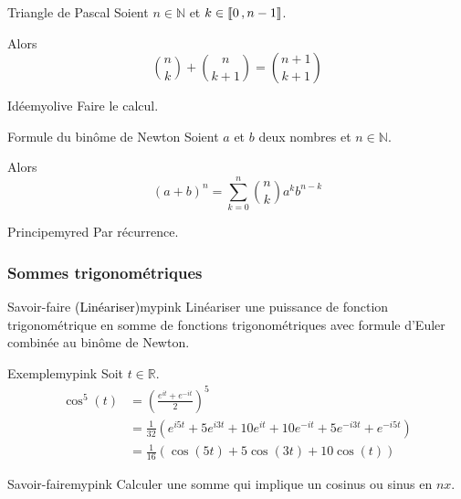     \begin{prop}{Triangle de Pascal}{}
        Soient $n \in \mathbb{N}$ et $k \in \left\llbracket 0 \, , n-1 \right\rrbracket$.
    
        Alors \[ \binom{n}{k} + \binom{n}{k+1} = \binom{n+1}{k+1} \]
    \end{prop}
    
    \begin{demo}{Idée}{myolive}
        Faire le calcul.
    \end{demo}

    \begin{theo}{Formule du binôme de Newton}{}
        Soient $a$ et $b$ deux nombres et $n \in \mathbb{N}$.
    
        Alors \[ (a+b)^{n} = \sum\limits_{k = 0}^{n} \binom{n}{k} a^{k} b^{n-k} \]
    \end{theo}
    
    \begin{demo}{Principe}{myred}
        Par récurrence.
    \end{demo}

\subsubsection{Sommes trigonométriques}

    \begin{omed}{Savoir-faire \textcolor{black}{(Linéariser)}}{mypink}
        Linéariser une puissance de fonction trigonométrique en somme de fonctions trigonométriques avec formule d’Euler combinée au binôme de Newton.
    \end{omed}
     
    \begin{omed}{Exemple}{mypink}
        Soit $t \in \mathbb{R}$.
    \begin{align*}
       \cos^5(t) &= \left(\frac{e^{it} + e^{-it}}{2}\right)^5 \\
       & = \frac{1}{32} \left(e^{i5t} + 5e^{i3t} + 10e^{it} + 10 e^{-it} + 5 e^{-i3t} + e^{-i5t}\right) \\
       & = \frac{1}{16} \left(\cos(5t) + 5 \cos(3t)+ 10 \cos(t)\right) 
    \end{align*}
    \end{omed}

    \begin{omed}{Savoir-faire}{mypink}
        Calculer une somme qui implique un cosinus ou sinus en $nx$.
    \end{omed}

